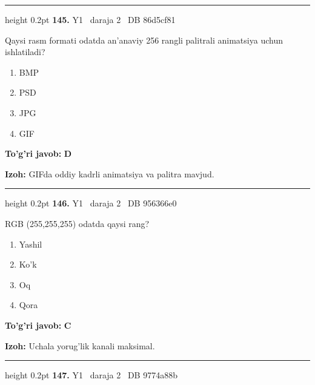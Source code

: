 \documentclass[10pt,a4paper,oneside]{article}
\begin{document}
\vspace{2mm}\hrule height 0.2pt \vspace{4mm}
\hypertarget{q145}{\textbf{\color{ink}145.}}  {\color{muted}\scriptsize Y1 \textbullet\ daraja 2 \textbullet\ DB 86d5cf81}
\par
Qaysi rasm formati odatda an'anaviy 256 rangli palitrali animatsiya uchun ishlatiladi?
\begin{enumerate}[label=\Alph*),leftmargin=9mm]
\item BMP
\item PSD
\item JPG
\item GIF
\end{enumerate}
\begin{tcolorbox}[enhanced,breakable,colback=teal!4,colframe=teal!45!black,boxrule=0.45pt,arc=1.2mm,left=2.8mm,right=2.8mm,top=2mm,bottom=2mm,before skip=2mm,after skip=2mm]
\textbf{\color{teal}To'g'ri javob:} \textbf{D}
\par\smallskip
\textbf{Izoh:} GIFda oddiy kadrli animatsiya va palitra mavjud.
\end{tcolorbox}
\vspace{2mm}\hrule height 0.2pt \vspace{4mm}
\hypertarget{q146}{\textbf{\color{ink}146.}}  {\color{muted}\scriptsize Y1 \textbullet\ daraja 2 \textbullet\ DB 956366e0}
\par
RGB (255,255,255) odatda qaysi rang?
\begin{enumerate}[label=\Alph*),leftmargin=9mm]
\item Yashil
\item Ko'k
\item Oq
\item Qora
\end{enumerate}
\begin{tcolorbox}[enhanced,breakable,colback=teal!4,colframe=teal!45!black,boxrule=0.45pt,arc=1.2mm,left=2.8mm,right=2.8mm,top=2mm,bottom=2mm,before skip=2mm,after skip=2mm]
\textbf{\color{teal}To'g'ri javob:} \textbf{C}
\par\smallskip
\textbf{Izoh:} Uchala yorug'lik kanali maksimal.
\end{tcolorbox}
\vspace{2mm}\hrule height 0.2pt \vspace{4mm}
\hypertarget{q147}{\textbf{\color{ink}147.}}  {\color{muted}\scriptsize Y1 \textbullet\ daraja 2 \textbullet\ DB 9774a88b}
\par
\end{document}
